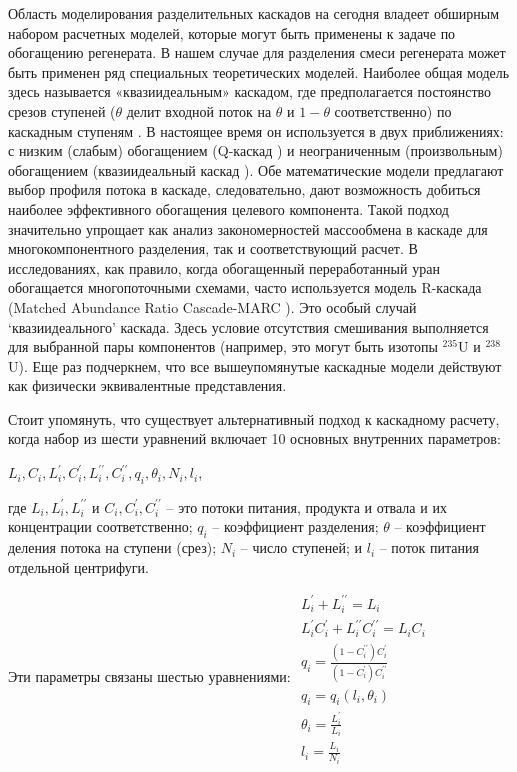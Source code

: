 Область моделирования разделительных каскадов на сегодня владеет обширным набором расчетных моделей, которые могут быть применены к задаче по обогащению регенерата. В нашем случае для разделения смеси регенерата может быть применен ряд специальных теоретических моделей. Наиболее общая модель здесь называется «квазиидеальным» каскадом, где предполагается постоянство срезов ступеней ($\theta$ делит входной поток на $\theta$ и $1 - \theta$ соответственно) по каскадным ступеням \cite{yamamotoMulticomponentIsotopeSeparating1978}. В настоящее время он используется в двух приближениях: с низким (слабым) обогащением (Q-каскад \cite{borisevichNewApproachOptimize2011, kolokoltsovDesignCascadesSeparating1970, zengQCascadeExplanation2012}) и неограниченным (произвольным) обогащением (квазиидеальный каскад \cite{sulaberidzeSpecialFeaturesEnrichment2006}). Обе математические модели предлагают выбор профиля потока в каскаде, следовательно, дают возможность добиться наиболее эффективного обогащения целевого компонента. Такой подход значительно упрощает как анализ закономерностей массообмена в каскаде для многокомпонентного разделения, так и соответствующий расчет. В исследованиях, как правило, когда обогащенный переработанный уран обогащается многопоточными схемами, часто используется модель R-каскада (Matched Abundance Ratio Cascade-MARC \cite{delagarzaMulticomponentIsotopeSeparation1961, woodEffectsSeparationProcesses2008, kazukihidaSimultaneousEvaluationEffects}). Это особый случай `квазиидеального' каскада. Здесь условие отсутствия смешивания выполняется для выбранной пары компонентов (например, это могут быть изотопы $^{235}$U и $^{238}$U). Еще раз подчеркнем, что все вышеупомянутые каскадные модели действуют как физически эквивалентные представления. 

Стоит упомянуть, что существует альтернативный подход к каскадному расчету, когда набор из шести уравнений включает 10 основных внутренних параметров:

$L_{i}, C_{i}, L_{i}^{\prime}, C_{i}^{\prime}, L_{i}^{\prime \prime}, C_{i}^{\prime \prime}, q_{i}, \theta_{i}, N_{i}, l_{i}$,

где $L_{i}, L_{i}^{\prime}, L_{i}^{\prime \prime}$ и $C_{i}, C_{i}^{\prime}, C_{i}^{\prime \prime}$ -- 
это потоки питания, продукта и отвала и их концентрации соответственно; $q_{i}$ -- коэффициент разделения; $\theta$ -- коэффициент деления потока на ступени (срез); $N_{i}$ -- число ступеней; и $l_{i}$ -- поток питания отдельной центрифуги.

Эти параметры связаны шестью уравнениями:
$\begin{array}{c}
  {L_{i}^{\prime}+L_{i}^{\prime \prime}=L_{i}} \\
  {L_{i}^{\prime} C_{i}^{\prime}+L_{i}^{\prime \prime} C_{i}^{\prime \prime}=L_{i} C_{i}} \\
  {q_{i}=\frac{(1-C_{i}^{\prime \prime}) C_{i}^{\prime}}{(1-C_{i}^{\prime}) C_{i}^{\prime \prime}}} \\
  {q_{i}=q_{i}\left(l_{i}, \theta_{i}\right)} \\
  {\theta_{i}=\frac{L_{i}^{\prime}}{L_{i}}} \\
  {l_{i}=\frac{L_{i}}{N_{i}}}
\end{array}$


